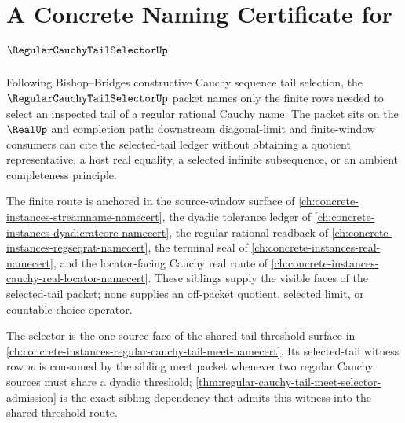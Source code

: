 \chapter{A Concrete Naming Certificate for $\RegularCauchyTailSelectorUp$}
\label{ch:concrete-instances-reg-cauchy-tail-sel-namecert}

Following Bishop--Bridges constructive Cauchy sequence tail selection, the $\RegularCauchyTailSelectorUp$ packet names only the finite rows needed to select an inspected tail of a regular rational Cauchy name. The packet sits on the $\RealUp$ and completion path: downstream diagonal-limit and finite-window consumers can cite the selected-tail ledger without obtaining a quotient representative, a host real equality, a selected infinite subsequence, or an ambient completeness principle.

The finite route is anchored in the source-window surface of \autoref{ch:concrete-instances-streamname-namecert}, the dyadic tolerance ledger of \autoref{ch:concrete-instances-dyadicratcore-namecert}, the regular rational readback of \autoref{ch:concrete-instances-regseqrat-namecert}, the terminal seal of \autoref{ch:concrete-instances-real-namecert}, and the locator-facing Cauchy real route of \autoref{ch:concrete-instances-cauchy-real-locator-namecert}. These siblings supply the visible faces of the selected-tail packet; none supplies an off-packet quotient, selected limit, or countable-choice operator.

The selector is the one-source face of the shared-tail threshold surface in \autoref{ch:concrete-instances-regular-cauchy-tail-meet-namecert}. Its selected-tail witness row $w$ is consumed by the sibling meet packet whenever two regular Cauchy sources must share a dyadic threshold; \autoref{thm:regular-cauchy-tail-meet-selector-admission} is the exact sibling dependency that admits this witness into the shared-threshold route.

